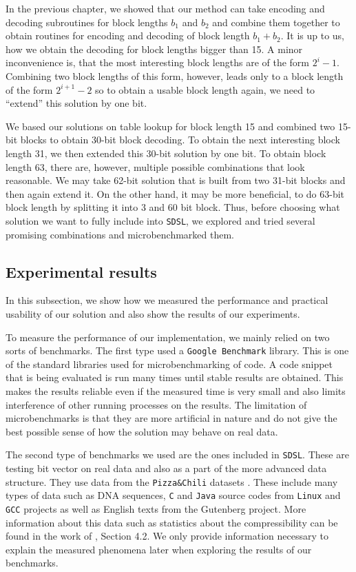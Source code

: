 In the previous chapter, we showed that our method can take encoding and decoding subroutines
for block lengths $b_1$ and $b_2$ and combine them together to obtain routines for encoding and
decoding of block length $b_1+b_2$. It is up to us, how we obtain the decoding for block
lengths bigger than 15. A minor inconvenience is, that the most interesting block lengths are of
the form $2^i-1$. Combining two block lengths of this form, however, leads only to a block length
of the form $2^{i+1}-2$ so to obtain a usable block length again, we need to ``extend'' this solution
by one bit.

We based our solutions on table lookup for block length 15 and combined two 15-bit blocks to obtain
30-bit block decoding. To obtain the next interesting block length 31, we then extended this 30-bit
solution by one bit. To obtain block length 63, there are, however, multiple possible combinations
that look reasonable. We may take 62-bit solution that is built from two 31-bit blocks
and then again extend it. On the other hand, it may be more beneficial, to do 63-bit block length by
splitting it into 3 and 60 bit block. Thus, before choosing what solution we want to fully include
into \texttt{SDSL}, we explored and tried several promising combinations and microbenchmarked them.

\subsection{Experimental results}

In this subsection, we show how we measured the performance and practical usability of our solution
and also show the results of our experiments.

To measure the performance of our implementation, we mainly relied on two sorts of benchmarks.
The first type used a \texttt{Google Benchmark} library. This is one of the standard libraries
used for microbenchmarking of code. A code snippet that is being evaluated is run many times
until stable results are obtained. This makes the results reliable even if the measured time
is very small and also limits interference of other running processes on the results. The
limitation of microbenchmarks is that they are more artificial in nature and
do not give the best possible sense of how the solution may behave on real data.

The second type of benchmarks we used are the ones included in \texttt{SDSL}. These are
testing bit vector on real data and also as a part of the more advanced data structure.
They use data from the \texttt{Pizza\&Chili} datasets \citep{ferragina2005pizza}. These
include many types of data such as DNA sequences, \texttt{C} and \texttt{Java} source codes
from \texttt{Linux} and \texttt{GCC} projects as well as English texts from the Gutenberg
project. More information about this data such as statistics about the compressibility can
be found in the work of \cite{ferragina2009compressed}, Section 4.2. We only provide information
necessary to explain the measured phenomena later when exploring the results of our benchmarks.

